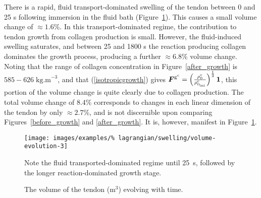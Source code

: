 There is a rapid, fluid transport-dominated swelling of the tendon
between 0 and 25 s following immersion in the fluid bath
(Figure~\ref{volume_evolution}). This causes a small volume change of
$\approx 1.6$\%. In this transport-dominated regime, the contribution
to tendon growth from collagen production is small. However, the
fluid-induced swelling saturates, and between 25 and 1800 s the
reaction producing collagen dominates the growth process, producing a
further $\approx 6.8$\% volume change. Noting that the range of
collagen concentration in Figure~\ref{after_growth} is $585-626\;
\mbox{kg.m}^{-3}$, and that (\ref{isotropicgrowth}) gives
$\mbox{\boldmath$ F$}^{\mathrm{g}^\mathrm{c}} = \left( \frac{\rho_0^\mathrm{c}}
{\rho_{0_{\mathrm{ini}}} ^\mathrm{c}} \right) ^ {\frac{1}{3}}
{\bf 1}$, this portion of the volume change is quite clearly due
to collagen production. The total volume change of $8.4$\%
corresponds to changes in each linear dimension of the tendon by
only $\approx 2.7$\%, and is not discernible upon comparing
Figures~\ref{before_growth} and \ref{after_growth}. It is,
however, manifest in Figure~\ref{volume_evolution}.

\begin{figure}[!hpt]
  \begin{center}
    \texttt{[image: images/examples/\%
      lagrangian/swelling/volume-evolution-3]}
    \caption{The volume of the tendon (m$^3$) evolving with time.}
    \label{volume_evolution}
  \end{center}
      {Note the fluid transported-dominated regime until 25~s,
        followed by the longer reaction-dominated growth stage.}
\end{figure}





